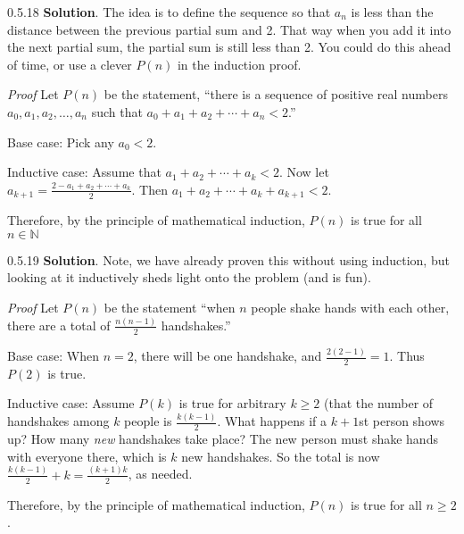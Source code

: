 \documentclass[11pt,]{book}
\makeatletter
\theoremstyle{ptxplainnotitle}
\theoremstyle{ptxplaintitle}
\renewcommand*{\proofname}{Proof}
\renewenvironment{proof}[1][\proofname]{\par
  \pushQED{\qed}%
  \normalfont \topsep6\p@\@plus6\p@\relax
  \trivlist
  \item\relax
    {\itshape
    #1\@addpunct{.}}\hspace\labelsep\ignorespaces
}{%
  \popQED\endtrivlist\@endpefalse
}
\theoremstyle{ptxdefinitionnotitle}
\theoremstyle{ptxdefinitiontitle}
\theoremstyle{ptxdefinitionnotitle}
\theoremstyle{ptxdefinitiontitle}
\theoremstyle{ptxdefinitionnotitle}
\theoremstyle{ptxdefinitiontitle}
\theoremstyle{ptxdefinitiontitlenonumber}
\theoremstyle{ptxdefinitiontitlenonumber}
\numberwithin{equation}{chapter}
\newcommand{\N}{\mathbb N}
\newcommand{\lt}{<}
\makeatother
\begin{document}
\begin{divisionexercise}{0.5.18}
\textbf{Solution}.\quad%
\hypertarget{p-671}{}%
The idea is to define the sequence so that \(a_n\) is less than the distance between the previous partial sum and 2. That way when you add it into the next partial sum, the partial sum is still less than 2. You could do this ahead of time, or use a clever \(P(n)\) in the induction proof.%
\begin{proof}\hypertarget{proof-19}{}
\hypertarget{p-672}{}%
Let \(P(n)\) be the statement, ``there is a sequence of positive real numbers \(a_0, a_1, a_2, \ldots, a_n\) such that \(a_0 + a_1 + a_2 + \cdots + a_n \lt  2\).''%
\par
\hypertarget{p-673}{}%
Base case: Pick any \(a_0 \lt  2\).%
\par
\hypertarget{p-674}{}%
Inductive case: Assume that \(a_1 + a_2 + \cdots + a_k \lt  2\). Now let \(a_{k+1} = \frac{2- a_1 + a_2 + \cdots + a_k}{2}\). Then \(a_1 + a_2 + \cdots +a_k + a_{k+1} \lt  2\).%
\par
\hypertarget{p-675}{}%
Therefore, by the principle of mathematical induction, \(P(n)\) is true for all \(n \in \N\)%
\end{proof}
\end{divisionexercise}%
\begin{divisionexercise}{0.5.19}
\textbf{Solution}.\quad%
\hypertarget{p-677}{}%
Note, we have already proven this without using induction, but looking at it inductively sheds light onto the problem (and is fun).%
\begin{proof}\hypertarget{proof-20}{}
\hypertarget{p-678}{}%
Let \(P(n)\) be the statement ``when \(n\) people shake hands with each other, there are a total of \(\frac{n(n-1)}{2}\) handshakes.''%
\par
\hypertarget{p-679}{}%
Base case: When \(n=2\), there will be one handshake, and \(\frac{2(2-1)}{2} = 1\).  Thus \(P(2)\) is true.%
\par
\hypertarget{p-680}{}%
Inductive case: Assume \(P(k)\) is true for arbitrary \(k\ge 2\) (that the number of handshakes among \(k\) people is \(\frac{k(k-1)}{2}\).  What happens if a \(k+1\)st person shows up?  How many \emph{new} handshakes take place?  The new person must shake hands with everyone there, which is \(k\) new  handshakes.  So the total is now \(\frac{k(k-1)}{2} + k = \frac{(k+1)k}{2}\), as needed.%
\par
\hypertarget{p-681}{}%
Therefore, by the principle of mathematical induction, \(P(n)\) is true for all \(n \ge 2\).%
\end{proof}
\end{divisionexercise}%
\end{document}
